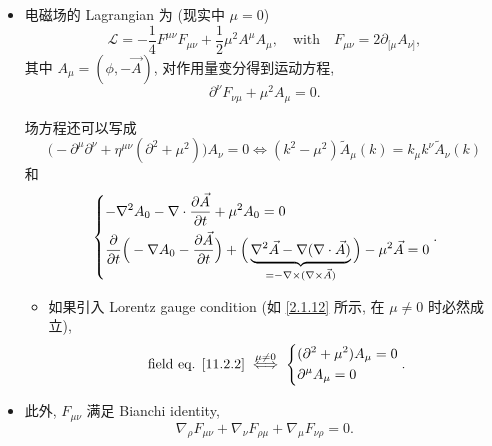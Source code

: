 \begin{itemize}
	\item 电磁场的 Lagrangian 为 (现实中 $\mu = 0$)
	\begin{equation} \label{11.2.1}
		\mathcal{L} = - \frac{1}{4} F^{\mu \nu} F_{\mu \nu} + \frac{1}{2} \mu^2 A^\mu A_\mu, \quad \text{with} \quad F_{\mu \nu} = 2 \partial_{[\mu} A_{\nu]},
	\end{equation}
	其中 $A_\mu = (\phi, - \vec{A})$, 对作用量变分得到运动方程,
	\begin{equation} \label{11.2.2}
		\partial^\nu F_{\nu \mu} + \mu^2 A_\mu = 0.
	\end{equation}
	
	\begin{tcolorbox}[title=calculation:]
		场方程还可以写成
		\begin{equation}
			\Big( - \partial^\mu \partial^\nu + \eta^{\mu \nu} (\partial^2 + \mu^2) \Big) A_\nu = 0 \iff (k^2 - \mu^2) \tilde{A}_\mu(k) = k_\mu k^\nu \tilde{A}_\nu(k)
		\end{equation}
		和
		\begin{equation}
			\begin{dcases}
				- \nabla^2 A_0 - \nabla \cdot \frac{\partial \vec{A}}{\partial t} + \mu^2 A_0 = 0 \\
				\frac{\partial}{\partial t} \Big( - \nabla A_0 - \frac{\partial \vec{A}}{\partial t} \Big) + \Big( \underbrace{\nabla^2 \vec{A} - \nabla (\nabla \cdot \vec{A})}_{= - \nabla \times (\nabla \times \vec{A})} \Big) - \mu^2 \vec{A} = 0
			\end{dcases}.
		\end{equation}
	\end{tcolorbox}
	
	\begin{itemize}
		\item 如果引入 Lorentz gauge condition (如 \eqref{2.1.12} 所示, 在 $\mu \neq 0$ 时必然成立),
		\begin{equation}
			\text{field eq. \eqref{11.2.2}} \overset{\mu \neq 0}{\iff} \begin{dcases}
				(\partial^2 + \mu^2) A_\mu = 0 \\
				\partial^\mu A_\mu = 0
			\end{dcases}.
		\end{equation}
	\end{itemize}
	
	\item 此外, $F_{\mu \nu}$ 满足 Bianchi identity,
	\begin{equation} \label{11.2.4}
		\nabla_\rho F_{\mu \nu} + \nabla_\nu F_{\rho \mu} + \nabla_\mu F_{\nu \rho} = 0.
	\end{equation}
	

\end{itemize}
